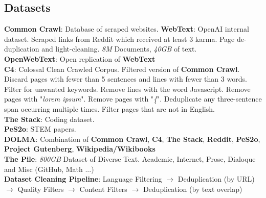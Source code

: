 \begin{multicols}{2}
\begin{mdframed}[style=eqbox]
        \subsection{Datasets}
        \textbf{Common Crawl}: Database of scraped websites.
        \textbf{WebText}: OpenAI internal dataset. Scraped links from Reddit which received at least 3 karma. Page de-duplication and light-cleaning. \textit{8M} Documents, \textit{40GB} of text.\\
        \textbf{OpenWebText}: Open replication of \textbf{WebText}\\
        \textbf{C4}: Colossal Clean Crawled Corpus. Filtered version of \textbf{Common Crawl}. Discard pages with fewer than 5 sentences and lines with fewer than 3 words. Filter for unwanted keywords. Remove lines with the word Javascript. Remove pages with "\textit{lorem ipsum}". Remove pages with "\textit{\{}". Deduplicate any three-sentence span occurring multiple times. Filter pages that are not in English.\\
        \textbf{The Stack}: Coding dataset.\\
        \textbf{PeS2o}: STEM papers.\\
        \textbf{DOLMA}: Combination of \textbf{Common Crawl}, \textbf{C4}, \textbf{The Stack}, \textbf{Reddit}, \textbf{PeS2o}, \textbf{Project Gutenberg}, \textbf{Wikipedia/Wikibooks}\\
        \textbf{The Pile}: \textit{800GB} Dataset of Diverse Text. Academic, Internet, Prose, Dialoque and Misc (GitHub, Math ...)\\[0.5em]
        \textbf{Dataset Cleaning Pipeline}: Language Filtering $\to$ Deduplication (by URL) $\to$ Quality Filters $\to$ Content Filters $\to$ Deduplication (by text overlap)
    \end{mdframed}

    \begin{mdframed}[style=eqbox]

\end{mdframed}
\end{multicols}
